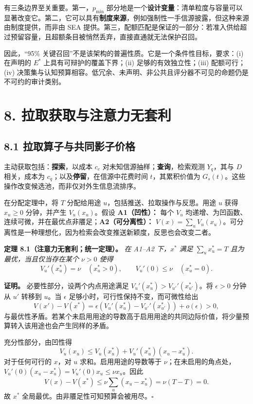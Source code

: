 \documentclass[
  chinese,
  11pt]{article}
\begin{document}
有三条边界至关重要。第一，\(p_{\min}\) 部分地是一个\textbf{设计变量}：清单粒度与容量可以显著改变它。第二，它可以具有\textbf{制度来源}，例如强制性一手信源披露，但这种来源由制度提供，而非由 SEA 提供。第三，配额匹配是保证的一部分：若准入供给超过预留容量，且超额条目被悄然丢弃，直接直通就无法保护召回。

因此，``95\% 关键召回''不是该架构的普遍性质。它是一个条件性目标，要求：(i) 在声明的 \(E^*\) 上具有可辩护的覆盖下界；(ii) 足够的有效独立性；(iii) 配额可行；(iv) 决策集与认知预算相容。低冗余、未声明、非公共且评分器不可见的命题仍是不可约的审计类别。

\section{8. 拉取获取与注意力无套利}\label{ux62c9ux53d6ux83b7ux53d6ux4e0eux6ce8ux610fux529bux65e0ux5957ux5229}

\subsection{8.1 拉取算子与共同影子价格}\label{ux62c9ux53d6ux7b97ux5b50ux4e0eux5171ux540cux5f71ux5b50ux4ef7ux683c}

主动获取包括：\textbf{探索}，以成本 \(c_e\) 对未知信源抽样；\textbf{查询}，检索观测 \(Y_q\)，其与 \(D\) 相关，成本为 \(c_q\)；以及\textbf{停留}，在信源中花费时间 \(t\)，其累积价值为 \(G_s(t)\)。这些操作改变候选池，而非仅对外生信息流排序。

在分配定理中，将 \(T\) 分配给用途 \(u\)，包括推送、拉取操作与反思。用途 \(u\) 获得 \(x_u\geq0\) 分钟，并产生 \(V_u(x_u)\)。假设 \textbf{A1（凹性）：} 每个 \(V_u\) 均递增、为凹函数、连续可微，并在最优点非餍足；\textbf{A2（可分离性）：} \(V(x)=\sum_uV_u(x_u)\)。可分离性是一种理想化，因为检索会改变推送新颖度，反思也会改变二者。

\textbf{定理 8.1（注意力无套利；统一定理）。} \emph{在 A1--A2 下，\(x^*\) 满足 \(\sum_ux_u^*=T\) 且为最优，当且仅当存在某个 \(\nu>0\) 使得} \[
V_u'(x_u^*)=\nu\quad(x_u^*>0),
\qquad
V_u'(0)\leq\nu\quad(x_u^*=0).
\tag{17}
\]

\textbf{证明。} 必要性部分，设两个内点用途满足 \(V_u'(x_u^*)>V_{u'}'(x_{u'}^*)\)。将 \(\epsilon>0\) 分钟从 \(u'\) 转移到 \(u\)。当 \(\epsilon\) 足够小时，可行性保持不变，而可微性给出 \[
V(x')-V(x^*)=\epsilon(V_u'(x_u^*)-V_{u'}'(x_{u'}^*))+o(\epsilon)>0,
\] 与最优性矛盾。若某个未启用用途的导数高于启用用途的共同边际价值，将少量预算转入该用途也会产生同样的矛盾。

充分性部分，由凹性得 \[
V_u(x_u)\leq V_u(x_u^*)+V_u'(x_u^*)(x_u-x_u^*).
\] 对于任何可行的 \(x\)，对 \(u\) 求和。启用用途的导数等于 \(\nu\)；在未启用的角点处，\(V_u'(0)(x_u-x_u^*)=V_u'(0)x_u\leq\nu x_u\)。因此 \[
V(x)-V(x^*)\leq\nu\sum_u(x_u-x_u^*)=\nu(T-T)=0.
\] 故 \(x^*\) 全局最优。由非餍足性可知预算会被用尽。\(\square\)
\end{document}
